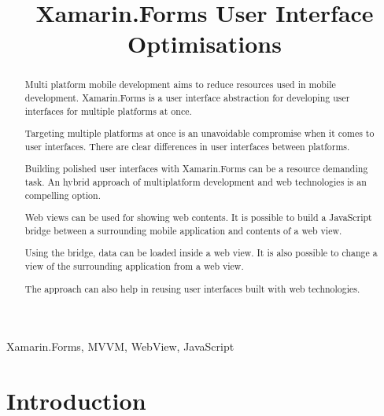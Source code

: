 \documentclass[conference]{IEEEtran}
\begin{document}
\title{Xamarin.Forms User Interface Optimisations}

\author{
}

\maketitle

\begin{abstract}
  Multi platform mobile development aims to reduce resources used in mobile development. Xamarin.Forms is a user interface abstraction for developing user interfaces for multiple platforms at once.

  Targeting multiple platforms at once is an unavoidable compromise when it comes to user interfaces. There are clear differences in user interfaces between platforms.

  Building polished user interfaces with Xamarin.Forms can be a resource demanding task. An hybrid approach of multiplatform development and web technologies is an compelling option.

  Web views can be used for showing web contents. It is possible to build a JavaScript bridge between a surrounding mobile application and contents of a web view.

  Using the bridge, data can be loaded inside a web view. It is also possible to change a view of the surrounding application from a web view.

  The approach can also help in reusing user interfaces built with web technologies.
\end{abstract}

\begin{IEEEkeywords}
  Xamarin.Forms, MVVM, WebView, JavaScript
\end{IEEEkeywords}

\section{Introduction}
\end{document}
